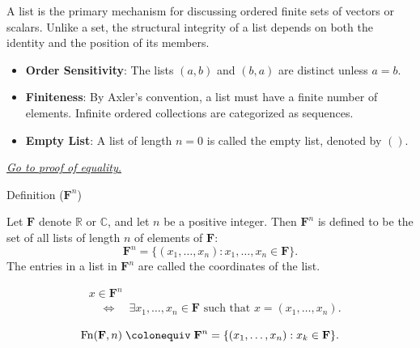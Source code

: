 \begin{remark*}[Interpretation]
A list is the primary mechanism for discussing ordered finite sets of vectors or scalars. Unlike a set, the structural integrity of a list depends on both the identity and the position of its members.
\begin{itemize}
    \item \textbf{Order Sensitivity}: The lists $(a, b)$ and $(b, a)$ are distinct unless $a=b$.
    \item \textbf{Finiteness}: By Axler's convention, a list must have a finite number of elements. Infinite ordered collections are categorized as sequences.
    \item \textbf{Empty List}: A list of length $n=0$ is called the empty list, denoted by $()$.
\end{itemize}
\end{remark*}

\smallskip
\noindent
\hyperref[prf:list-equality]{\textit{Go to proof of equality.}}

\NoLocalDependencies

\begin{definitionbox}{Definition ($\mathbf{F}^n$)}
\begin{definition}[$\mathbf{F}^n$]
\label{def:Fn}
Let $\mathbf{F}$ denote $\mathbb{R}$ or $\mathbb{C}$, and let $n$ be a positive integer.
Then $\mathbf{F}^n$ is defined to be the set of all lists of length $n$ of elements of $\mathbf{F}$:
\[
\mathbf{F}^n
=
\{(x_1,\dots,x_n) : x_1,\dots,x_n \in \mathbf{F}\}.
\]
The entries in a list in $\mathbf{F}^n$ are called the coordinates of the list.
\end{definition}
\end{definitionbox}

\begin{remark*}
\[
\begin{aligned}
&x \in \mathbf{F}^n \\
&\quad\Longleftrightarrow\quad
\exists x_1,\dots,x_n \in \mathbf{F}
\text{ such that }
x = (x_1,\dots,x_n).
\end{aligned}
\]
\end{remark*}

\begin{remark*}
\[
\operatorname{Fn}(\mathbf{F},n)
\;\colonequiv\;
\mathbf{F}^n = \{(x_1,\ldots,x_n) : x_k \in \mathbf{F}\}.
\]
\end{remark*}

